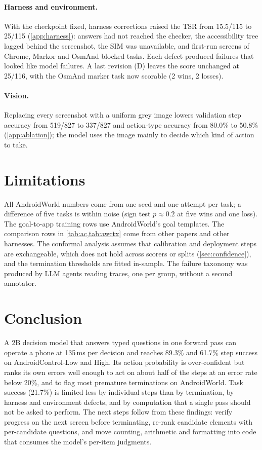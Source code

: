 \documentclass{article}
\begin{document}
\paragraph{Harness and environment.}
With the checkpoint fixed, harness corrections raised the TSR from 15.5/115 to 25/115 (\cref{app:harness}):
answers had not reached the checker, the accessibility tree lagged behind the screenshot, the SIM was
unavailable, and first-run screens of Chrome, Markor and OsmAnd blocked tasks. Each defect produced failures
that looked like model failures.
A last revision (D) leaves the score unchanged at 25/116, with the OsmAnd marker task now scorable
(2 wins, 2 losses).

\paragraph{Vision.}
Replacing every screenshot with a uniform grey image lowers validation step accuracy from 519/827 to 337/827 and
action-type accuracy from 80.0\% to 50.8\% (\cref{app:ablation}); the model uses the image mainly to decide which
kind of action to take.

\section{Limitations}
All AndroidWorld numbers come from one seed and one attempt per task; a difference of five tasks is within
noise (sign test $p \approx 0.2$ at five wins and one loss). The goal-to-app training rows use AndroidWorld's goal
templates. The comparison rows in \cref{tab:ac,tab:awctx} come from other papers and other harnesses. The
conformal analysis assumes that calibration and deployment steps are exchangeable, which does not hold across
scorers or splits (\cref{sec:confidence}), and the termination thresholds are fitted in-sample. The failure
taxonomy was produced by LLM agents reading traces, one per group, without a second annotator.

\section{Conclusion}
A 2B decision model that answers typed questions in one forward pass can operate a phone at 135\,ms per decision
and reaches 89.3\% and 61.7\% step success on AndroidControl-Low and High. Its action probability is
over-confident but ranks its own errors well enough to act on about half of the steps at an error rate below
20\%, and to flag most premature terminations on AndroidWorld. Task success (21.7\%) is limited less by
individual steps than by termination, by harness and environment defects, and by computation that a single pass
should not be asked to perform. The next steps follow from these findings: verify progress on the next screen
before terminating, re-rank candidate elements with per-candidate questions, and move counting, arithmetic and
formatting into code that consumes the model's per-item judgments.
\end{document}
